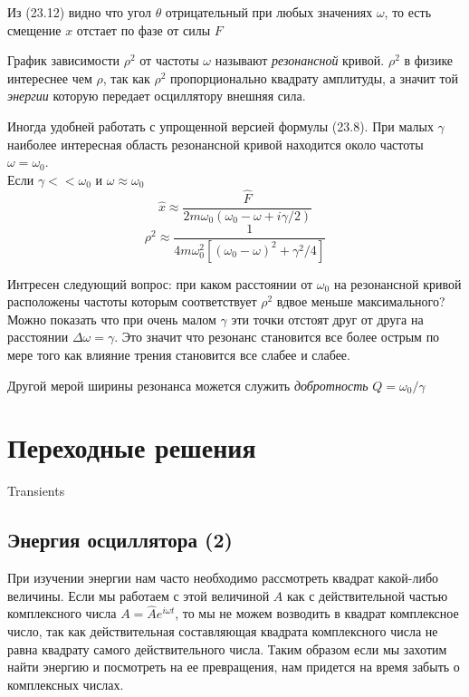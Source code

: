 \documentclass[12pt]{article}
\begin{document}
Из (23.12) видно что угол  \(\theta\) отрицательный при любых значениях \(\omega\), то есть смещение \(x\) отстает по фазе от силы \(F\)

График зависимости \(\rho^2\) от частоты \(\omega\) называют \textit{резонансной} кривой. \(\rho^2\) в физике интереснее чем \(\rho\), так как \(\rho^2\) пропорционально квадрату амплитуды, а значит той \textit{энергии} которую передает осциллятору внешняя сила.

Иногда удобней работать с упрощенной версией формулы (23.8). При малых \(\gamma\) наиболее интересная область резонансной кривой находится около частоты \(\omega=\omega_0\).\\
Если \(\gamma<<\omega_0\) и \(\omega \approx \omega_0\)
\[
    \hat{x} \approx \frac{\hat{F}}{2m\omega_0(\omega_0-\omega+i\gamma/2)}
\]
\[
    \rho^2 \approx \frac{1}{4m\omega_0^2[(\omega_0-\omega)^2+\gamma^2/4]}
\]

Интресен следующий вопрос: при каком расстоянии от \(\omega_0\) на резонансной кривой расположены частоты которым соответствует \(\rho^2\) вдвое меньше максимального? Можно показать что при очень малом \(\gamma\) эти точки отстоят друг от друга на расстоянии \(\Delta \omega = \gamma\). Это значит что резонанс становится все более острым по мере того как влияние трения становится все слабее и слабее.

Другой мерой ширины резонанса можется служить \textit{добротность} \(Q = \omega_0 / \gamma\)

\newpage

\section{Переходные решения}

Transients

\subsection{Энергия осциллятора (2)}

При изучении энергии нам часто необходимо рассмотреть квадрат какой-либо величины. Если мы работаем с этой величиной \(A\) как с действительной частью комплексного числа \(A=\hat{A}e^{i \omega t}\), то мы не можем возводить в квадрат комплексное число, так как действительная составляющая квадрата комплексного числа не равна квадрату самого действительного числа. Таким образом если мы захотим найти энергию и посмотреть на ее превращения, нам придется на время забыть о комплексных числах.
\end{document}
